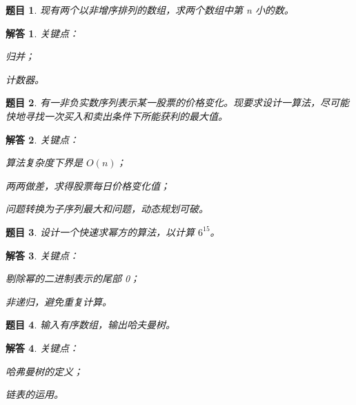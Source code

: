 \documentclass[UTF8, final]{ctexart}
\newtheorem{question}{题目}
\newtheorem{solution}{解答}
\begin{document}
\begin{question}
现有两个以非增序排列的数组，求两个数组中第 n 小的数。
\end{question}
\begin{solution}
关键点：
\begin{compactitem}
    \item 归并；
    \item 计数器。
\end{compactitem}

\end{solution}

\begin{question}
\label{q:stocks}
有一非负实数序列表示某一股票的价格变化。现要求设计一算法，尽可能快地寻找一次买入和卖出条件下所能获利的最大值。
\end{question}
\begin{solution}
关键点：
\begin{compactitem}
    \item 算法复杂度下界是 $O(n)$；
    \item 两两做差，求得股票每日价格变化值；
    \item 问题转换为子序列最大和问题，动态规划可破。
\end{compactitem}

\end{solution}

\begin{question}
设计一个快速求幂方的算法，以计算 $6^{15}$。
\end{question}
\begin{solution}
关键点：
\begin{compactitem}
    \item 剔除幂的二进制表示的尾部 0；
    \item 非递归，避免重复计算。
\end{compactitem}

\end{solution}

\begin{question}
输入有序数组，输出哈夫曼树。
\end{question}
\begin{solution}
关键点：
\begin{compactitem}
    \item 哈弗曼树的定义；
    \item 链表的运用。
\end{compactitem}

\end{solution}
\end{document}
